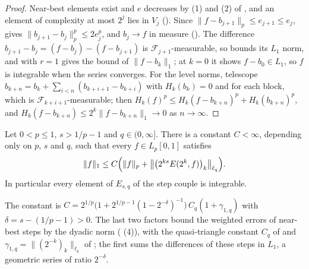 \begin{proof}
\leanok
Near-best elements exist and $e$ decreases by (1) and (2) of , and an
element of complexity at most $2^j$ lies in $V_j$ (). Since
$\|f - b_{j+1}\|_p \leq e_{j+1} \leq e_j$,  gives
$\|b_{j+1} - b_j\|_p^p \leq 2 e_j^p$, and $b_j \to f$ in measure
(). The difference $b_{j+1} - b_j = (f - b_j) - (f - b_{j+1})$ is
$\mathcal{F}_{j+1}$-measurable, so  bounds its $L_1$ norm, and
 with $r = 1$ gives the bound of $\|f - b_k\|_1$; at $k = 0$ it shows
$f - b_0 \in L_1$, so $f$ is integrable when the series converges. For the level norms, telescope
$b_{k+n} = b_k + \sum_{i<n} (b_{k+i+1} - b_{k+i})$ with $H_k(b_k) = 0$ and
 for each block, which is $\mathcal{F}_{k+i+1}$-measurable; then
$H_k(f)^p \leq H_k(f - b_{k+n})^p + H_k(b_{k+n})^p$, and
$H_k(f - b_{k+n}) \leq 2^k \|f - b_{k+n}\|_1 \to 0$ as $n \to \infty$.
\end{proof}

\begin{theorem}
\label{thm:besov-into-l1}
\leanok
{}
Let $0 < p \leq 1$, $s > 1/p - 1$ and $q \in (0, \infty]$. There is a constant $C < \infty$,
depending only on $p$, $s$ and $q$, such that every $f \in L_p[0, 1]$ satisfies
\[
  \|f\|_1 \leq C \Bigl( \|f\|_p + \bigl\| \bigl( 2^{ks} E(2^k, f) \bigr)_k \bigr\|_{\ell_q} \Bigr) .
\]
In particular every element of $E_{s,q}$ of the step couple is integrable.
\end{theorem}

The constant is
$C = 2^{1/p} \bigl(1 + 2^{1/p - 1} (1 - 2^{-\delta})^{-1}\bigr) \, C_q (1 + \gamma_{1,q})$ with
$\delta = s - (1/p - 1) > 0$. The last two factors bound the weighted errors of near-best steps
by the dyadic norm ( (4)), with the quasi-triangle constant $C_q$ of
 and $\gamma_{1,q} = \|(2^{-k})_k\|_{\ell_q}$ of
; the first sums the differences of these steps in $L_1$, a geometric series
of ratio $2^{-\delta}$.

